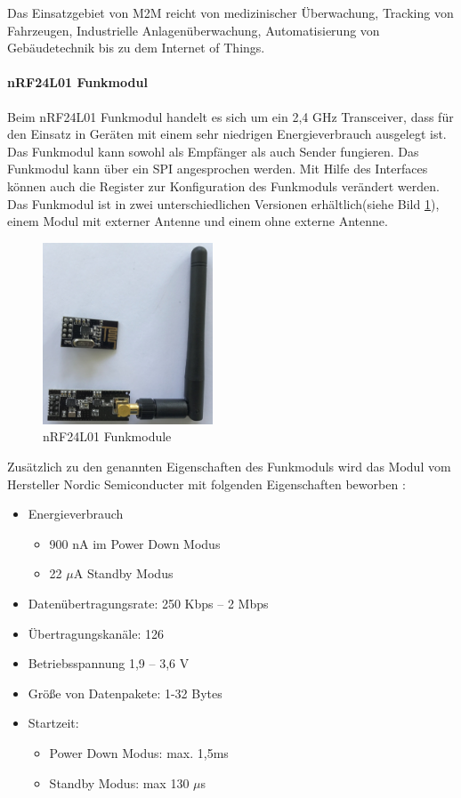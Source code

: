 Das Einsatzgebiet von M2M reicht von medizinischer Überwachung, Tracking von Fahrzeugen, Industrielle Anlagenüberwachung, Automatisierung von Gebäudetechnik bis zu dem Internet of Things.

\paragraph{nRF24L01 Funkmodul} Beim nRF24L01 Funkmodul handelt es sich um ein 2,4 GHz Transceiver, dass für den Einsatz in Geräten mit einem sehr niedrigen Energieverbrauch  ausgelegt ist. Das Funkmodul kann sowohl als Empfänger als auch Sender fungieren. Das Funkmodul kann über ein \ac{SPI} angesprochen werden. Mit Hilfe des Interfaces können auch die Register zur Konfiguration des Funkmoduls verändert werden. Das Funkmodul ist in zwei unterschiedlichen Versionen erhältlich(siehe Bild \ref{img:RF24Funkmodul}), einem Modul mit externer Antenne und einem ohne externe Antenne.

\begin{figure} [!p]
	\centering
	\includegraphics[width=0.45\textwidth]{bilder/RF24Funkmodul.jpg}
	\caption{nRF24L01 Funkmodule}
	\label{img:RF24Funkmodul}
\end{figure}
Zusätzlich zu den genannten Eigenschaften des Funkmoduls wird das Modul vom Hersteller Nordic Semiconducter mit folgenden Eigenschaften beworben \cite{semiconductor2007nrf24l01}:
\begin{itemize}
	\item Energieverbrauch
	\begin{itemize}
		\item 900 nA im Power Down Modus
		\item 22 $\mu$A Standby Modus
	\end{itemize}
	\item Datenübertragungsrate: 250 Kbps – 2 Mbps
	\item Übertragungskanäle: 126
	\item Betriebsspannung 1,9 – 3,6 V
	\item Größe von Datenpakete: 1-32 Bytes
	\item Startzeit:
	\begin{itemize}
		\item Power Down Modus: max. 1,5ms
		\item Standby Modus: max 130 $\mu$s
	\end{itemize}
\end{itemize}
